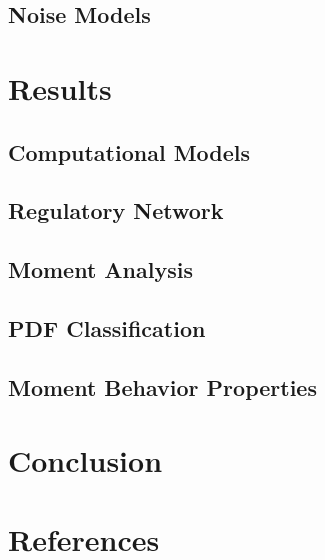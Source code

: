 \subsection{Noise Models}



\section{Results}


\subsection{Computational Models}


\subsection{Regulatory Network}


\subsection{Moment Analysis}


\subsection{PDF Classification}


\subsection{Moment Behavior Properties}


\section{Conclusion}


\section{References}
